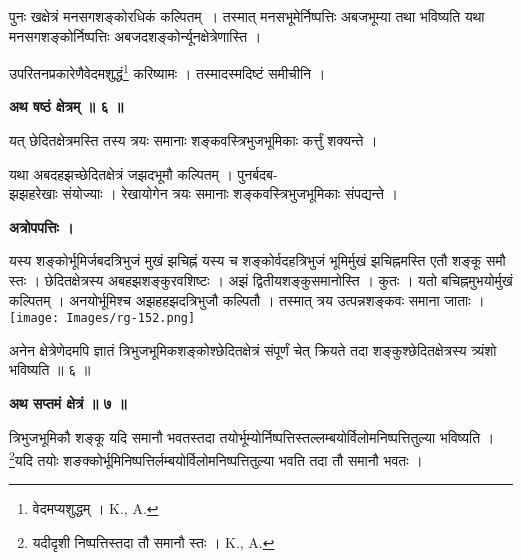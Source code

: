 \documentclass[11pt, openany]{book}
\begin{document}
पुनः खक्षेत्रं मनसगशङ्कोरधिकं कल्पितम्~। तस्मात् मनसभूमेर्निष्पत्तिः अबजभूम्या तथा भविष्यति यथा मनसगशङ्कोर्निष्पत्तिः अबजदशङ्कोर्न्यूनक्षेत्रेणास्ति । \\
\vspace{5mm}

उपरितनप्रकारेणैवेदमशुद्धं\renewcommand{\thefootnote}{२}\footnote{वेदमप्यशुद्धम् । {\en K., A.}} करिष्यामः । तस्मादस्मदिष्टं समीचीनि । \\
\vspace{3mm}

\begin{center}
\textbf{\large अथ षष्ठं क्षेत्रम् ॥ ६ ॥}
\end{center}
\vspace{5mm}

{\ab यत् छेदितक्षेत्रमस्ति तस्य त्रयः समानाः शङ्कवस्त्रिभुजभूमिकाः कर्त्तुं शक्यन्ते । }\\
\vspace{3mm}


यथा अबदहझच्छेदितक्षेत्रं जझदभूमौ कल्पितम् । पुनर्बदब- \\

\newpage
\noindent झझहरेखाः संयोज्याः । रेखायोगेन त्रयः समानाः शङ्कवस्त्रिभुजभूमिकाः संपद्यन्ते । \\
\begin{center}
\textbf{ अत्रोपपत्तिः । }
\end{center}
\vspace{5mm}

\begin{vwcol}[widths={0.7,0.3}, sep=.8cm, rule=0pt]
यस्य शङ्कोर्भूमिर्जबदत्रिभुजं मुखं झचिह्नं यस्य च शङ्कोर्वदहत्रिभुजं भूमिर्मुखं झचिह्नमस्ति एतौ शङ्कू समौ स्तः । छेदितक्षेत्रस्य अबहझशङ्कुरवशिष्टः । अझं द्वितीयशङ्कुसमानोस्ति । कुतः । यतो बचिह्नमुभयोर्मुखं कल्पितम् । अनयोर्भूमिश्च अझहहझदत्रिभुजौ कल्पितौ । तस्मात् त्रय उत्पन्नशङ्कवः समाना जाताः । \\
\noindent \texttt{[image: Images/rg-152.png]}  
\end{vwcol}
\vspace{5mm}

अनेन क्षेत्रेणेदमपि ज्ञातं त्रिभुजभूमिकशङ्कोश्छेदितक्षेत्रं संपूर्णं
चेत् क्रियते तदा शङ्कुश्छेदितक्षेत्रस्य त्र्यंशो भविष्यति ॥ ६ ॥ \\
\begin{center}
\textbf{\large अथ सप्तमं क्षेत्रं ॥ ७ ॥ }
\end{center}
\vspace{5mm}

{\ab त्रिभुजभूमिकौ शङ्कू यदि समानौ भवतस्तदा तयोर्भूम्योर्निष्पत्तिस्तल्लम्बयोर्विलोमनिष्पत्तितुल्या भविष्यति । \renewcommand{\thefootnote}{१}\footnote{यदीदृशी निष्पत्तिस्तदा तौ समानौ स्तः । {\en K., A.}}यदि तयोः शङक्कोर्भूमिनिष्पत्तिर्लम्बयोर्विलोमनिष्पत्तितुल्या भवति तदा तौ समानौ भवतः । }\\
\vspace{3mm}
\end{document}
